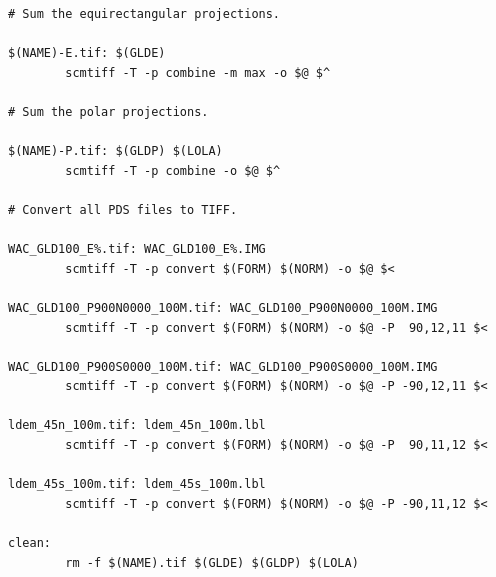 \documentclass[oneside,10pt]{memoir}
\begin{document}
\begin{Spacing}{1.1}
\begin{Verbatim}
# Sum the equirectangular projections.

$(NAME)-E.tif: $(GLDE)
        scmtiff -T -p combine -m max -o $@ $^

# Sum the polar projections.

$(NAME)-P.tif: $(GLDP) $(LOLA)
        scmtiff -T -p combine -o $@ $^

# Convert all PDS files to TIFF.

WAC_GLD100_E%.tif: WAC_GLD100_E%.IMG
        scmtiff -T -p convert $(FORM) $(NORM) -o $@ $<

WAC_GLD100_P900N0000_100M.tif: WAC_GLD100_P900N0000_100M.IMG
        scmtiff -T -p convert $(FORM) $(NORM) -o $@ -P  90,12,11 $<

WAC_GLD100_P900S0000_100M.tif: WAC_GLD100_P900S0000_100M.IMG
        scmtiff -T -p convert $(FORM) $(NORM) -o $@ -P -90,12,11 $<

ldem_45n_100m.tif: ldem_45n_100m.lbl
        scmtiff -T -p convert $(FORM) $(NORM) -o $@ -P  90,11,12 $<

ldem_45s_100m.tif: ldem_45s_100m.lbl
        scmtiff -T -p convert $(FORM) $(NORM) -o $@ -P -90,11,12 $<

clean:
        rm -f $(NAME).tif $(GLDE) $(GLDP) $(LOLA)
\end{Verbatim}

\printpagenotes
\end{Spacing}
\end{document}
